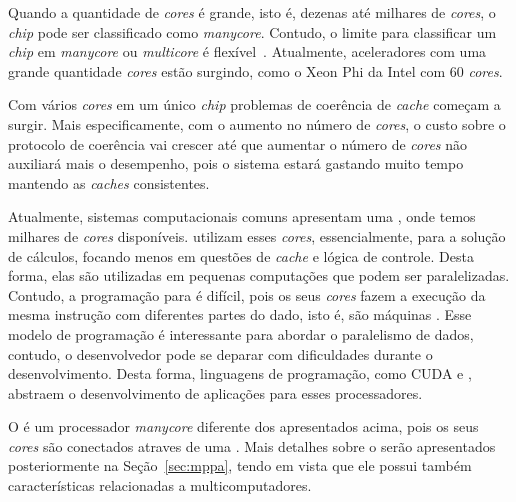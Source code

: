 Quando a quantidade de \textit{cores} é grande, isto é, dezenas até milhares de
\textit{cores}, o \textit{chip} pode ser classificado como \textit{manycore}.
Contudo, o limite para classificar um \textit{chip} em \textit{manycore} ou
\textit{multicore} é flexível~\cite{Tanenbaum2015}.
Atualmente, aceleradores com uma grande quantidade \textit{cores} estão
surgindo, como o Xeon Phi da Intel com 60 \textit{cores}.

Com vários \textit{cores} em um único \textit{chip} problemas de coerência de
\textit{cache} começam a surgir. Mais especificamente, com o aumento no número
de \textit{cores}, o custo sobre o protocolo de coerência vai crescer até que
aumentar o número de \textit{cores} não auxiliará mais o desempenho, pois o sistema
estará gastando muito tempo mantendo as \textit{caches} consistentes.


Atualmente, sistemas computacionais comuns apresentam uma \gpu, onde temos
milhares de \textit{cores} disponíveis. \gpus utilizam esses \textit{cores},
essencialmente, para a solução de cálculos, focando menos em questões de
\textit{cache} e lógica de controle. Desta forma, elas são utilizadas em
pequenas computações que podem ser paralelizadas. Contudo, a programação para
\gpus é difícil, pois os seus \textit{cores} fazem a execução da mesma instrução
com diferentes partes do dado, isto é, são máquinas \simd. Esse modelo de
programação é interessante para abordar o paralelismo de dados, contudo, o
desenvolvedor pode se deparar com dificuldades durante o desenvolvimento.
Desta forma, linguagens de programação, como CUDA e \opencl,
abstraem o desenvolvimento de aplicações para esses processadores.

O \mppa é um processador \textit{manycore} diferente dos apresentados acima,
pois os seus \textit{cores} são conectados atraves de uma \noc. Mais detalhes
sobre o \mppa serão apresentados posteriormente na Seção~\ref{sec:mppa}, tendo
em vista que ele possui também características relacionadas a multicomputadores.

